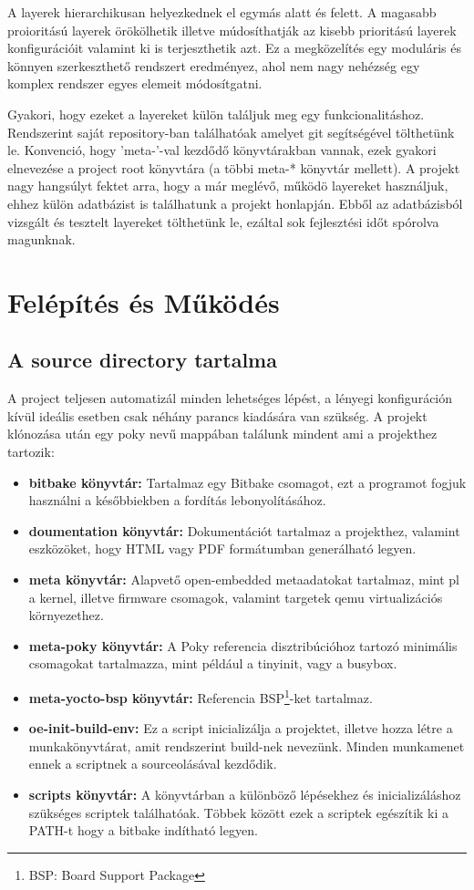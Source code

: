 A layerek hierarchikusan helyezkednek el egymás alatt és felett. A magasabb proioritású layerek örökölhetik illetve múdosíthatják az kisebb prioritású layerek konfigurációit valamint ki is terjeszthetik azt. Ez a megközelítés egy
moduláris és könnyen szerkeszthető rendszert eredményez, ahol nem nagy nehézség egy komplex rendszer egyes elemeit módosítgatni.

Gyakori, hogy ezeket a layereket külön találjuk meg egy funkcionalitáshoz. Rendszerint saját repository-ban találhatóak amelyet git segítségével tölthetünk le. Konvenció, hogy 'meta-'-val kezdődő könyvtárakban
vannak, ezek gyakori elnevezése a project root könyvtára (a többi meta-* könyvtár mellett). A projekt nagy hangsúlyt fektet arra, hogy a már meglévő, működö layereket használjuk, ehhez külön adatbázist is
találhatunk a projekt honlapján. Ebből az adatbázisból vizsgált és tesztelt layereket tölthetünk le, ezáltal sok fejlesztési időt spórolva magunknak.

\section{Felépítés és Működés}

\subsection{A source directory tartalma}
A project teljesen automatizál minden lehetséges lépést, a lényegi konfiguráción kívül ideális esetben csak néhány parancs kiadására van szükség. A projekt klónozása után egy poky nevű mappában találunk mindent ami a
projekthez tartozik:

\begin{itemize}
\item \textbf{bitbake könyvtár:} Tartalmaz egy Bitbake csomagot, ezt a programot fogjuk használni a későbbiekben a fordítás lebonyolításához.
\item \textbf{doumentation könyvtár:} Dokumentációt tartalmaz a projekthez, valamint eszközöket, hogy HTML vagy PDF formátumban generálható legyen.
\item \textbf{meta könyvtár:} Alapvető open-embedded metaadatokat tartalmaz, mint pl a kernel, illetve firmware csomagok, valamint targetek qemu virtualizációs környezethez.
\item \textbf{meta-poky könyvtár:} A Poky referencia disztribúcióhoz tartozó minimális csomagokat tartalmazza, mint például a tinyinit, vagy a busybox.
\item \textbf{meta-yocto-bsp könyvtár:} Referencia BSP\footnote{BSP: Board Support Package}-ket tartalmaz.
\item \textbf{oe-init-build-env:} Ez a script inicializálja a projektet, illetve hozza létre a munkakönyvtárat, amit rendszerint build-nek nevezünk. Minden munkamenet ennek a scriptnek a sourceolásával kezdődik.
\item \textbf{scripts könyvtár:} A könyvtárban a különböző lépésekhez és inicializáláshoz szükséges scriptek találhatóak. Többek között ezek a scriptek egészítik ki a PATH-t hogy a bitbake indítható legyen.
\end{itemize}

